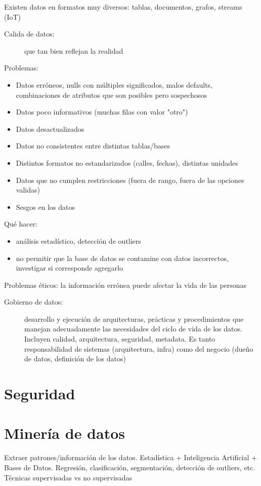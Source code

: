 Existen datos en formatos muy diversos: tablas, documentos, grafos, streams (IoT)

\begin{description}
	\item[Calida de datos:] que tan bien reflejan la realidad
\end{description}

Problemas:

\begin{itemize}
	\item Datos erróneos, nulls con múltiples significados, malos defaults, combinaciones de atributos que son posibles pero sospechosos
	\item Datos poco informativos (muchas filas con valor "otro")
	\item Datos desactualizados
	\item Datos no consistentes entre distintas tablas/bases
	\item Distintos formatos no estandarizados (calles, fechas), distintas unidades
	\item Datos que no cumplen restricciones (fuera de rango, fuera de las opciones validas)
	\item Sesgos en los datos
\end{itemize}

Qué hacer:

\begin{itemize}
	\item análisis estadístico, detección de outliers
	\item no permitir que la base de datos se contamine con datos incorrectos, investigar si corresponde agregarlo
\end{itemize}

Problemas éticos: la información errónea puede afectar la vida de las personas

\begin{description}
	\item[Gobierno de datos:] desarrollo y ejecución de arquitecturas, prácticas y procedimientos que manejan adecuadamente las necesidades del ciclo de vida de los datos. Incluyen calidad, arquitectura, seguridad, metadata. Es tanto responsabilidad de sistemas (arquitectura, infra) como del negocio (dueño de datos, definición de los datos)
\end{description}

\section{Seguridad}

\section{Minería de datos}

Extraer patrones/información de los datos.
Estadística + Inteligencia Artificial + Bases de Datos.
Regresión, clasificación, segmentación, detección de outliers, etc.
Técnicas supervisadas vs no supervisadas
